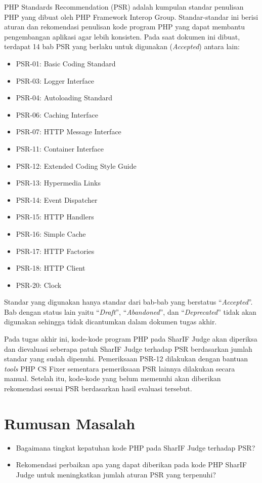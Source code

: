 \documentclass[a4paper,twoside]{article}
\begin{document}
	PHP Standards Recommendation (PSR) adalah kumpulan standar penulisan PHP yang dibuat oleh PHP Framework Interop Group. Standar-standar ini berisi aturan dan rekomendasi penulisan kode program PHP yang dapat membantu pengembangan aplikasi agar lebih konsisten. Pada saat dokumen ini dibuat, terdapat 14 bab PSR yang berlaku untuk digunakan (\textit{Accepted}) antara lain:
	\begin{itemize}
		\item PSR-01: Basic Coding Standard
		\item PSR-03: Logger Interface
		\item PSR-04: Autoloading Standard
		\item PSR-06: Caching Interface
		\item PSR-07: HTTP Message Interface
		\item PSR-11: Container Interface
		\item PSR-12: Extended Coding Style Guide
		\item PSR-13: Hypermedia Links
		\item PSR-14: Event Dispatcher
		\item PSR-15: HTTP Handlers
		\item PSR-16: Simple Cache
		\item PSR-17: HTTP Factories
		\item PSR-18: HTTP Client
		\item PSR-20: Clock
	\end{itemize}
	Standar yang digunakan hanya standar dari bab-bab yang berstatus ``\textit{Accepted}''. Bab dengan status lain yaitu ``\textit{Draft}'', ``\textit{Abandoned}'', dan ``\textit{Deprecated}'' tidak akan digunakan sehingga tidak dicantumkan dalam dokumen tugas akhir.
	
	Pada tugas akhir ini, kode-kode program PHP pada SharIF Judge akan diperiksa dan dievaluasi seberapa patuh SharIF Judge terhadap PSR berdasarkan jumlah standar yang sudah dipenuhi. Pemeriksaan PSR-12 dilakukan dengan bantuan \textit{tools} PHP CS Fixer sementara pemeriksaan PSR lainnya dilakukan secara manual. Setelah itu, kode-kode yang belum memenuhi akan diberikan rekomendasi sesuai PSR berdasarkan hasil evaluasi tersebut. 
	
	\section{Rumusan Masalah}
	\begin{itemize}
		\item Bagaimana tingkat kepatuhan kode PHP pada SharIF Judge terhadap PSR?  
		\item Rekomendasi perbaikan apa yang dapat diberikan pada kode PHP SharIF Judge untuk meningkatkan jumlah aturan PSR yang terpenuhi?
	\end{itemize}
	
\end{document}
